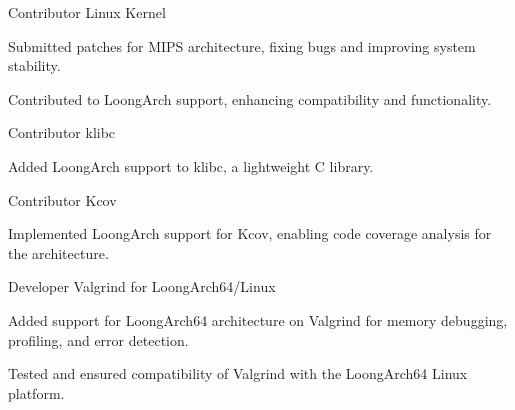 

\begin{cventries}

  \cventry
    {Contributor} %
    {Linux Kernel} %
    {} %
    {} %
    {
      \begin{cvitems} %
        \item {Submitted patches for MIPS architecture, fixing bugs and improving system stability.}
        \item {Contributed to LoongArch support, enhancing compatibility and functionality.}
      \end{cvitems}
    }

\cventry
{Contributor} %
{klibc} %
{} %
{} %
{
  \begin{cvitems} %
    \item {Added LoongArch support to klibc, a lightweight C library.}
  \end{cvitems}
}

\cventry
{Contributor} %
{Kcov} %
{} %
{} %
{
  \begin{cvitems} %
    \item {Implemented LoongArch support for Kcov, enabling code coverage analysis for the architecture.}
  \end{cvitems}
}

\cventry
{Developer} %
{Valgrind for LoongArch64/Linux} %
{} %
{} %
{
  \begin{cvitems} %
    \item {Added support for LoongArch64 architecture on Valgrind for memory debugging, profiling, and error detection.}
    \item {Tested and ensured compatibility of Valgrind with the LoongArch64 Linux platform.}
  \end{cvitems}
}


\end{cventries}
